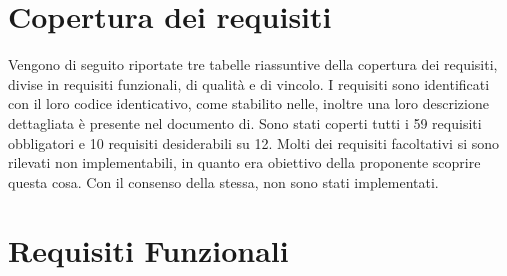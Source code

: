 \section{Copertura dei requisiti}
Vengono di seguito riportate tre tabelle riassuntive della copertura dei requisiti, divise in requisiti funzionali, di qualità e di vincolo. I requisiti sono identificati con il loro codice identicativo, come stabilito nelle\normediprogetto, inoltre una loro descrizione dettagliata è presente nel documento di\analisideirequisiti. Sono stati coperti tutti i 59 requisiti obbligatori e 10 requisiti desiderabili su 12. Molti dei requisiti facoltativi si sono rilevati non implementabili, in quanto era obiettivo della proponente scoprire questa cosa. Con il consenso della stessa, non sono stati implementati.
\section{Requisiti Funzionali}
\normalsize
